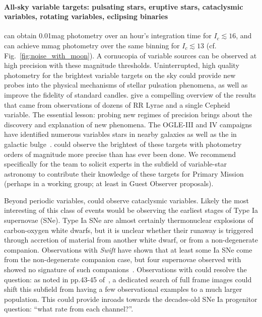 \paragraph{All-sky variable targets: pulsating stars, eruptive stars, cataclysmic variables, rotating variables, eclipsing binaries}
\tess can obtain 0.01mag photometry over an hour's integration time for $I_c \lesssim 16$, and can achieve mmag photometry over the same binning for $I_c \lesssim 13$ (cf. Fig.~\ref{fig:noise_with_moon}).
A cornucopia of variable sources can be observed at high precision with these magnitude thresholds.
Uninterrupted, high quality \tess photometry for the brightest variable targets on the sky could provide new probes into the physical mechanisms of stellar pulsation phenomena, as well as improve the fidelity of standard candles.
\citet{szabo_k2SEPWP_2013} give a compelling overview of the results that came from \keplers observations of dozens of RR Lyrae and a single Cepheid variable.
The essential lesson: probing new regimes of precision brings about the discovery and explanation of new phenomena.
The OGLE-III and IV campaigns have identified numerous variables stars in nearby galaxies as well as the in galactic bulge~\citep{soszynski_LMC_2009,soszynski_SMC_2010,soszynski_bulge_2011}.
\tess could observe the brightest of these targets with photometry orders of magnitude more precise than has ever been done.
We recommend specifically for the \tess team to solicit experts in the subfield of variable-star astronomy to contribute their knowledge of these targets for \tesss Primary Mission (perhaps in a working group; at least in Guest Observer proposals).

Beyond periodic variables, \tess could observe cataclysmic variables.
Likely the most interesting of this class of events would be observing the earliest stages of Type Ia supernovae (SNe).
Type Ia SNe are almost certainly thermonuclear explosions of carbon-oxygen white dwarfs, but it is unclear whether their runaway is triggered through accretion of material from another white dwarf, or from a non-degenerate companion.
Observations with \textit{Swift} have shown that at least some Ia SNe come from the non-degenerate companion case, but four supernovae observed with \kepler showed no signature of such companions~\citep{cao_swift_Ia_2015,olling_kepler_Ia_2015}.
Observations with \tess could resolve the question: as noted in pp.43-45 of~\citet{science_definition_team_report_big_2016}, a dedicated search of \tesss full frame images could shift this subfield from having a few observational examples to a much larger population.
This could provide inroads towards the decades-old SNe Ia progenitor question: ``what rate from each channel?''.

